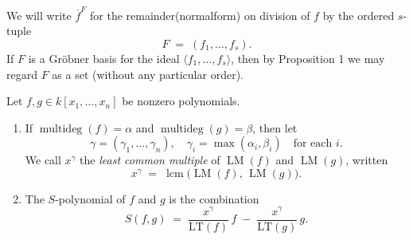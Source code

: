 \begin{definition}\label{def:Remainder} %
    \leanok %
    We will write \(\overline{f}^F\) for the remainder(normalform) on division of \(f\) by the ordered \(s\)-tuple
    \[
    F \;=\;(f_1,\dots,f_s).
    \]
    If \(F\) is a Gr{\"o}bner basis for the ideal \(\langle f_1,\dots,f_s\rangle\), then by Proposition 1
    we may regard \(F\) as a set (without any particular order).
\end{definition}

\begin{definition}\label{def:S-polynomial} %
    \leanok %
    Let \(f,g\in k[x_1,\dots,x_n]\) be nonzero polynomials.
    \begin{enumerate}
      \item If \(\operatorname{multideg}(f)=\alpha\) and \(\operatorname{multideg}(g)=\beta\), 
        then let 
        \[
          \gamma = (\gamma_1,\dots,\gamma_n),
          \quad
          \gamma_i = \max(\alpha_i,\beta_i)
          \quad\text{for each }i.
        \]
        We call \(x^\gamma\) the \emph{least common multiple} of \(\operatorname{LM}(f)\) and \(\operatorname{LM}(g)\),
        written
        \[
          x^\gamma \;=\;\operatorname{lcm}\bigl(\operatorname{LM}(f),\,\operatorname{LM}(g)\bigr).
        \]
      \item The \(S\)-polynomial of \(f\) and \(g\) is the combination
        \[
          S(f,g)
          \;=\;
          \frac{x^\gamma}{\mathrm{LT}(f)}\,f
          \;-\;
          \frac{x^\gamma}{\mathrm{LT}(g)}\,g.
        \]
    \end{enumerate}
\end{definition}

